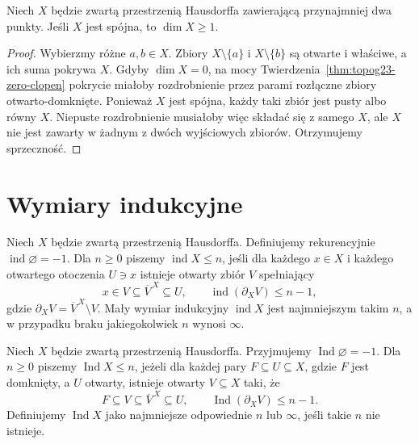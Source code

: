 \begin{twierdzenie}
\label{thm:topog23-connected-positive}
Niech \(X\) będzie zwartą przestrzenią Hausdorffa
zawierającą przynajmniej dwa punkty.
Jeśli \(X\) jest spójna, to \(\dim X\ge1\).
\end{twierdzenie}
\begin{proof}
Wybierzmy różne \(a,b\in X\).
Zbiory \(X\setminus\{a\}\) i
\(X\setminus\{b\}\) są otwarte i właściwe,
a ich suma pokrywa \(X\).
Gdyby \(\dim X=0\), na mocy
Twierdzenia~\ref{thm:topog23-zero-clopen}
pokrycie miałoby rozdrobnienie
przez parami rozłączne
zbiory otwarto-domknięte.
Ponieważ \(X\) jest spójna,
każdy taki zbiór jest pusty albo równy \(X\).
Niepuste rozdrobnienie musiałoby
więc składać się z samego \(X\),
ale \(X\) nie jest zawarty w żadnym
z dwóch wyjściowych zbiorów.
Otrzymujemy sprzeczność.
\end{proof}

\section{Wymiary indukcyjne}
\label{sec:topog23-inductive}

\begin{definicja}
\label{def:topog23-ind}
Niech \(X\) będzie zwartą przestrzenią Hausdorffa.
Definiujemy rekurencyjnie
\(\operatorname{ind}\varnothing=-1\).
Dla \(n\ge0\) piszemy
\(\operatorname{ind}X\le n\), jeśli
dla każdego \(x\in X\) i każdego otwartego
otoczenia \(U\ni x\) istnieje otwarty zbiór \(V\)
spełniający
\[
 x\in V\subseteq\overline V^{\,X}\subseteq U,
 \qquad
 \operatorname{ind}(\partial_XV)\le n-1,
\]
gdzie
\(\partial_XV=\overline V^{\,X}\setminus V\).
Mały wymiar indukcyjny
\(\operatorname{ind}X\) jest najmniejszym
takim \(n\), a w przypadku braku
jakiegokolwiek \(n\) wynosi \(\infty\).
\end{definicja}

\begin{definicja}
\label{def:topog23-Ind}
Niech \(X\) będzie zwartą przestrzenią Hausdorffa.
Przyjmujemy \(\operatorname{Ind}\varnothing=-1\).
Dla \(n\ge0\) piszemy
\(\operatorname{Ind}X\le n\), jeżeli
dla każdej pary \(F\subseteq U\subseteq X\),
gdzie \(F\) jest domknięty, a \(U\) otwarty,
istnieje otwarty \(V\subseteq X\) taki, że
\[
 F\subseteq V\subseteq\overline V^{\,X}\subseteq U,
 \qquad
 \operatorname{Ind}(\partial_XV)\le n-1.
\]
Definiujemy \(\operatorname{Ind}X\)
jako najmniejsze odpowiednie \(n\)
lub \(\infty\), jeśli takie \(n\) nie istnieje.
\end{definicja}

